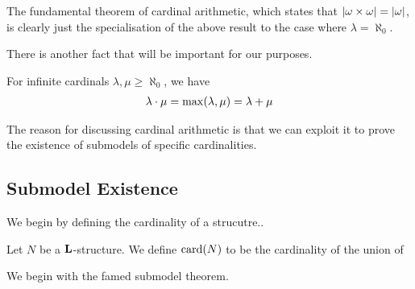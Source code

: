 The fundamental theorem of cardinal arithmetic, which states that $\left\lvert \omega \times \omega \right\rvert = \left\lvert \omega \right\rvert$, is clearly just the specialisation of the above result to the case where $\lambda = \aleph_{0}$.

There is another fact that will be important for our purposes.

\begin{boxtheorem}
    For infinite cardinals $\lambda, \mu \geq \aleph_{0}$, we have
    \begin{align*}
        \lambda \cdot \mu = \max\!\left( \lambda, \mu \right) = \lambda + \mu
    \end{align*}
\end{boxtheorem}

The reason for discussing cardinal arithmetic is that we can exploit it to prove the existence of submodels of specific cardinalities.

\subsection{Submodel Existence}

We begin by defining the cardinality of a strucutre..

\begin{boxdefinition}
    Let $N$ be a $\mathbf{L}$-structure. We define $\operatorname{card}\!\left( N \right)$ to be the cardinality of the union of 
\end{boxdefinition}

We begin with the famed submodel theorem.

